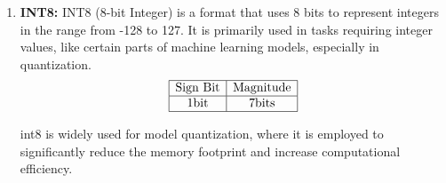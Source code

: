 \begin{enumerate}[label=\textbf{\roman*.}]
    \item \textbf{INT8:}
    INT8 (8-bit Integer) is a format that uses 8 bits to represent integers in the range from -128 to 127. It is primarily used in tasks requiring integer values, like certain parts of machine learning models, especially in quantization.
    \[
    \begin{array}{|c|c|}
        \hline
        \text{Sign Bit} & \text{Magnitude} \\
        \hline
        1 \text{bit} & 7 \text{bits} \\
        \hline
    \end{array}
    \]
    
    int8 is widely used for model quantization, where it is employed to significantly reduce the memory footprint and increase computational efficiency.


\end{enumerate}
